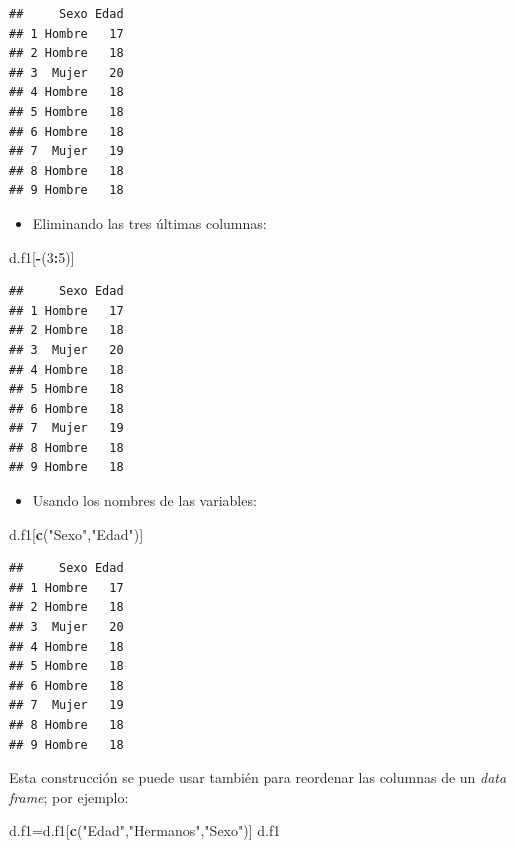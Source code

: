 \documentclass[]{book}
\newenvironment{Shaded}{\begin{snugshade}}{\end{snugshade}}
\newcommand{\DecValTok}[1]{\textcolor[rgb]{0.00,0.00,0.81}{#1}}
\newcommand{\KeywordTok}[1]{\textcolor[rgb]{0.13,0.29,0.53}{\textbf{#1}}}
\newcommand{\NormalTok}[1]{#1}
\newcommand{\OperatorTok}[1]{\textcolor[rgb]{0.81,0.36,0.00}{\textbf{#1}}}
\newcommand{\StringTok}[1]{\textcolor[rgb]{0.31,0.60,0.02}{#1}}
\providecommand{\tightlist}{%
  \setlength{\itemsep}{0pt}\setlength{\parskip}{0pt}}
\theoremstyle{definition}
\theoremstyle{definition}
\theoremstyle{definition}
\theoremstyle{remark}
\begin{document}
\begin{verbatim}
##     Sexo Edad
## 1 Hombre   17
## 2 Hombre   18
## 3  Mujer   20
## 4 Hombre   18
## 5 Hombre   18
## 6 Hombre   18
## 7  Mujer   19
## 8 Hombre   18
## 9 Hombre   18
\end{verbatim}

\begin{itemize}
\tightlist
\item
  Eliminando las tres últimas columnas:
\end{itemize}

\begin{Shaded}
\begin{Highlighting}[]
\NormalTok{d.f1[}\OperatorTok{-}\NormalTok{(}\DecValTok{3}\OperatorTok{:}\DecValTok{5}\NormalTok{)]}
\end{Highlighting}
\end{Shaded}

\begin{verbatim}
##     Sexo Edad
## 1 Hombre   17
## 2 Hombre   18
## 3  Mujer   20
## 4 Hombre   18
## 5 Hombre   18
## 6 Hombre   18
## 7  Mujer   19
## 8 Hombre   18
## 9 Hombre   18
\end{verbatim}

\begin{itemize}
\tightlist
\item
  Usando los nombres de las variables:
\end{itemize}

\begin{Shaded}
\begin{Highlighting}[]
\NormalTok{d.f1[}\KeywordTok{c}\NormalTok{(}\StringTok{"Sexo"}\NormalTok{,}\StringTok{"Edad"}\NormalTok{)]}
\end{Highlighting}
\end{Shaded}

\begin{verbatim}
##     Sexo Edad
## 1 Hombre   17
## 2 Hombre   18
## 3  Mujer   20
## 4 Hombre   18
## 5 Hombre   18
## 6 Hombre   18
## 7  Mujer   19
## 8 Hombre   18
## 9 Hombre   18
\end{verbatim}

Esta construcción se puede usar también para reordenar las columnas de un \emph{data frame}; por ejemplo:

\begin{Shaded}
\begin{Highlighting}[]
\NormalTok{d.f1=d.f1[}\KeywordTok{c}\NormalTok{(}\StringTok{"Edad"}\NormalTok{,}\StringTok{"Hermanos"}\NormalTok{,}\StringTok{"Sexo"}\NormalTok{)]}
\NormalTok{d.f1}
\end{Highlighting}
\end{Shaded}
\end{document}
